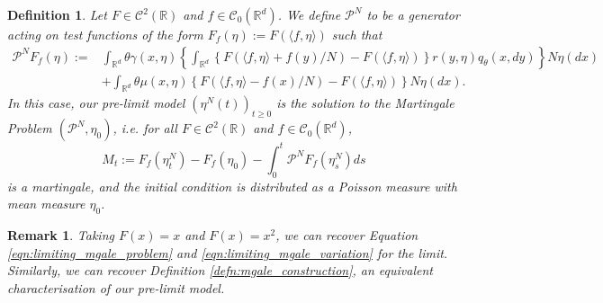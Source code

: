 \documentclass[12pt]{article}
\newtheorem{remark}[theorem]{Remark}
\newtheorem{definition}[theorem]{Definition}
\newcommand{\IR}{\mathbb R}
\newcommand{\Pgen}{\mathcal{P}}    %
\begin{document}
\begin{definition}
    \label{def: MP definition of pre-limit}
Let $F \in \mathcal{C}^{2}(\IR)$ and $f \in \mathcal{C}_{0}(\IR^d)$.
We define $\Pgen^N$ to be a generator
acting on test functions of the form
$F_f(\eta):=F (\langle f, \eta \rangle)$
such that 
\begin{equation}
\begin{aligned}
\Pgen^{N} F_f(\eta):=& \int_{\IR^d} \theta\gamma(x, \eta) \left\{\int_{\IR^d} \left\{F(\langle f, \eta \rangle + f(y)/N )-F(\langle f, \eta \rangle )\right\}r(y, \eta)q_{\theta}(x,dy)\right\}N\eta(dx)\\
&+\int_{\IR^d} \theta \mu(x, \eta) \left\{F(\langle f, \eta \rangle - f(x)/N )-F(\langle f, \eta \rangle )\right\}N\eta(dx).
\end{aligned}    
\end{equation}
In this case, our pre-limit model $(\eta^{N}(t))_{t \geq 0}$ is the solution to the Martingale Problem $(\Pgen^{N}, \eta_0)$, i.e. 
for all $F \in \mathcal{C}^{2}(\IR)$
and $f \in \mathcal{C}_{0}(\IR^d)$,
$$M_t:=F_f(\eta^{N}_t)-F_f(\eta_0)
-\int_{0}^{t}\Pgen^{N}F_f(\eta^{N}_s)ds$$
is a martingale, and the initial condition is distributed as a Poisson measure with mean measure $\eta_0$.
\end{definition}

\begin{remark}
Taking $F(x)=x$ and $F(x)=x^2$, we can recover Equation \eqref{eqn:limiting_mgale_problem} and \eqref{eqn:limiting_mgale_variation} for the limit.
Similarly, we can recover
Definition \ref{defn:mgale_construction},
an equivalent characterisation
of our pre-limit model.
\end{remark}
\end{document}
